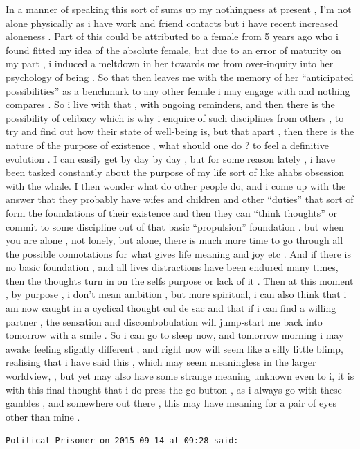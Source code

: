 \begin{footnotesize}
\begin{sffamily}
In a manner of speaking this sort of sums up my nothingness at present , I'm not alone physically as i have work and friend contacts but i have recent increased aloneness . Part of this could be attributed to a female from 5 years ago who i found fitted my idea of the absolute female, but due to an error of maturity on my part , i induced a meltdown in her towards me from over-inquiry into her psychology of being . So that then leaves me with the memory of her ``anticipated possibilities'' as a benchmark to any other female i may engage with and nothing compares . So i live with that , with ongoing reminders, and then there is the possibility of celibacy which is why i enquire of such disciplines from others , to try and find out how their state of well-being is, but that apart , then there is the nature of the purpose of existence , what should one do ? to feel a definitive evolution . I can easily get by day by day , but for some reason lately , i have been tasked constantly about the purpose of my life sort of like ahabs obsession with the whale. I then wonder what do other people do, and i come up with the answer that they probably have wifes and children and other ``duties'' that sort of form the foundations of their existence and then they can ``think thoughts'' or commit to some discipline out of that basic ``propulsion'' foundation . but when you are alone , not lonely, but alone, there is much more time to go through all the possible connotations for what gives life meaning and joy etc . And if there is no basic foundation , and all lives distractions have been endured many times, then the thoughts turn in on the selfs purpose or lack of it . Then at this moment , by purpose , i don't mean ambition , but more spiritual, i can also think that i am now caught in a cyclical thought cul de sac and that if i can find a willing partner , the sensation and discombobulation will jump-start me back into tomorrow with a smile . So i can go to sleep now, and tomorrow morning i may awake feeling slightly different , and right now will seem like a silly little blimp, realising that i have said this , which may seem meaningless in the larger worldview, , but yet may also have some strange meaning unknown even to i, it is with this final thought that i do press the go button , as i always go with these gambles , and somewhere out there , this may have meaning for a pair of eyes other than mine .

\hfill

\texttt{Political Prisoner on 2015-09-14 at 09:28 said:}


\end{sffamily}
\end{footnotesize}
